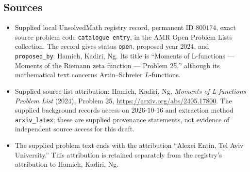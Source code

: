 \documentclass[11pt]{article}
\begin{document}
\subsection{Sources}
\begin{itemize}
\item Supplied local UnsolvedMath registry record, permanent ID \(800174\), exact source problem code \texttt{catalogue entry}, in the AMR Open Problem Lists collection. The record gives status \texttt{open}, proposed year \(2024\), and \texttt{proposed\_by}: Hamieh, Kadiri, Ng. Its title is ``Moments of L-functions --- Moments of the Riemann zeta function --- Problem 25,'' although its mathematical text concerns Artin--Schreier \(L\)-functions.
\item Supplied source-list attribution: Hamieh, Kadiri, Ng, \emph{Moments of L-functions Problem List} (2024), Problem 25, \url{https://arxiv.org/abs/2405.17800}. The supplied background records access on \(2026\text{-}10\text{-}16\) and extraction method \texttt{arxiv\_latex}; these are supplied provenance statements, not evidence of independent source access for this draft.
\item The supplied problem text ends with the attribution ``Alexei Entin, Tel Aviv University.'' This attribution is retained separately from the registry's attribution to Hamieh, Kadiri, Ng.
\end{itemize}
\end{document}
